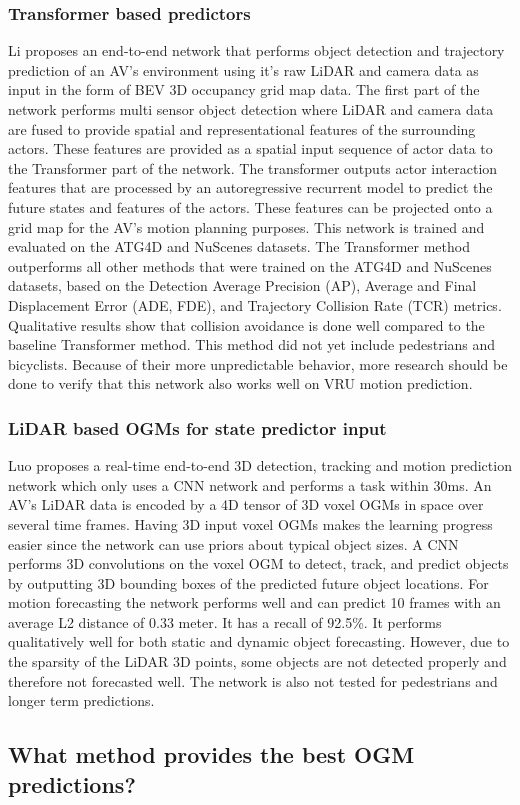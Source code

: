 \subsubsection{Transformer based predictors}
Li \cite{li2020end} proposes an end-to-end network that performs object detection and trajectory prediction of an AV's environment using it's raw LiDAR and camera data as input in the form of BEV 3D occupancy grid map data. The first part of the network performs multi sensor object detection where LiDAR and camera data are fused to provide spatial and representational features of the surrounding actors. These features are provided as a spatial input sequence of actor data to the Transformer part of the network. The transformer outputs actor interaction features that are processed by an autoregressive recurrent model to predict the future states and features of the actors. These features can be projected onto a grid map for the AV's motion planning purposes. This network is trained and evaluated on the ATG4D \cite{luo2018fast} and NuScenes \cite{caesar2020nuscenes} datasets. The Transformer method outperforms all other methods that were trained on the ATG4D and NuScenes datasets, based on the Detection Average Precision (AP), Average and Final Displacement Error (ADE, FDE), and Trajectory Collision Rate (TCR) metrics. Qualitative results show that collision avoidance is done well compared to the baseline Transformer method. This method did not yet include pedestrians and bicyclists. Because of their more unpredictable behavior, more research should be done to verify that this network also works well on VRU motion prediction.

\subsubsection{LiDAR based OGMs for state predictor input}
Luo \cite{luo2018fast} proposes a real-time end-to-end 3D detection, tracking and motion prediction network which only uses a CNN network and performs a task within 30ms. An AV's LiDAR data is encoded by a 4D tensor of 3D voxel OGMs in space over several time frames. Having 3D input voxel OGMs makes the learning progress easier since the network can use priors about typical object sizes. A CNN performs 3D convolutions on the voxel OGM to detect, track, and predict objects by outputting 3D bounding boxes of the predicted future object locations. For motion forecasting the network performs well and can predict 10 frames with an average L2 distance of 0.33 meter. It has a recall of 92.5\%. It performs qualitatively well for both static and dynamic object forecasting. However, due to the sparsity of the LiDAR 3D points, some objects are not detected properly and therefore not forecasted well. The network is also not tested for pedestrians and longer term predictions.




\subsection{What method provides the best OGM predictions?}
